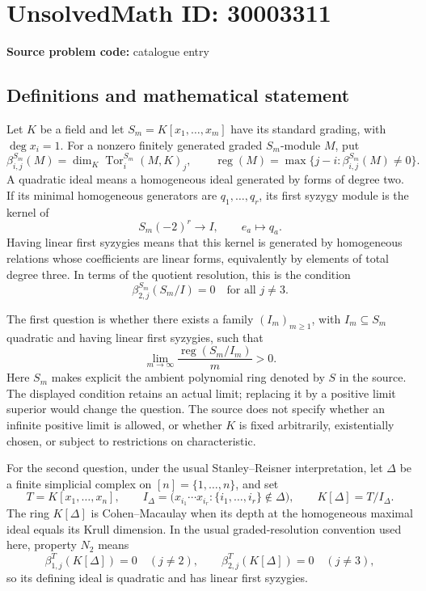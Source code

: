 \documentclass[11pt]{article}
\begin{document}
\section*{UnsolvedMath ID: 30003311}
\textbf{Source problem code:} catalogue entry
\subsection{Definitions and mathematical statement}
Let \(K\) be a field and let \(S_m=K[x_1,\ldots,x_m]\) have its standard grading, with \(\deg x_i=1\). For a nonzero finitely generated graded \(S_m\)-module \(M\), put
\[
\beta^{S_m}_{i,j}(M)=\dim_K\operatorname{Tor}^{S_m}_i(M,K)_j,
\qquad
\operatorname{reg}(M)=\max\{j-i:\beta^{S_m}_{i,j}(M)\ne0\}.
\]
A quadratic ideal means a homogeneous ideal generated by forms of degree two. If its minimal homogeneous generators are \(q_1,\ldots,q_r\), its first syzygy module is the kernel of
\[
S_m(-2)^r\longrightarrow I,\qquad e_a\longmapsto q_a.
\]
Having linear first syzygies means that this kernel is generated by homogeneous relations whose coefficients are linear forms, equivalently by elements of total degree three. In terms of the quotient resolution, this is the condition
\[
\beta^{S_m}_{2,j}(S_m/I)=0\quad\text{for all }j\ne3.
\]

The first question is whether there exists a family \((I_m)_{m\ge1}\), with \(I_m\subseteq S_m\) quadratic and having linear first syzygies, such that
\[
\lim_{m\to\infty}\frac{\operatorname{reg}(S_m/I_m)}{m}>0.
\]
Here \(S_m\) makes explicit the ambient polynomial ring denoted by \(S\) in the source. The displayed condition retains an actual limit; replacing it by a positive limit superior would change the question. The source does not specify whether an infinite positive limit is allowed, or whether \(K\) is fixed arbitrarily, existentially chosen, or subject to restrictions on characteristic.

For the second question, under the usual Stanley--Reisner interpretation, let \(\Delta\) be a finite simplicial complex on \([n]=\{1,\ldots,n\}\), and set
\[
T=K[x_1,\ldots,x_n],\qquad
I_\Delta=\bigl(x_{i_1}\cdots x_{i_r}:\{i_1,\ldots,i_r\}\notin\Delta\bigr),\qquad
K[\Delta]=T/I_\Delta.
\]
The ring \(K[\Delta]\) is Cohen--Macaulay when its depth at the homogeneous maximal ideal equals its Krull dimension. In the usual graded-resolution convention used here, property \(N_2\) means
\[
\beta^T_{1,j}(K[\Delta])=0\quad(j\ne2),\qquad
\beta^T_{2,j}(K[\Delta])=0\quad(j\ne3),
\]
so its defining ideal is quadratic and has linear first syzygies.
\end{document}
